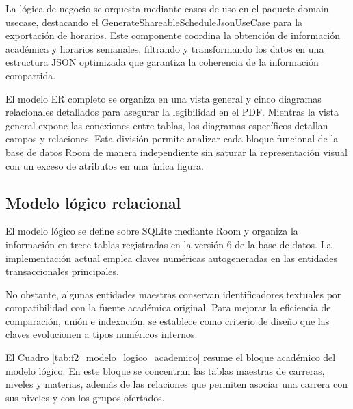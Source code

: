 La lógica de negocio se orquesta mediante casos de uso en el paquete domain usecase, destacando el GenerateShareableScheduleJsonUseCase para la exportación de horarios. Este componente coordina la obtención de información académica y horarios semanales, filtrando y transformando los datos en una estructura JSON optimizada que garantiza la coherencia de la información compartida.

El modelo ER completo se organiza en una vista general y cinco diagramas relacionales detallados para asegurar la legibilidad en el PDF. Mientras la vista general expone las conexiones entre tablas, los diagramas específicos detallan campos y relaciones. Esta división permite analizar cada bloque funcional de la base de datos Room de manera independiente sin saturar la representación visual con un exceso de atributos en una única figura.

\subsection{Modelo lógico relacional}
El modelo lógico se define sobre SQLite mediante Room y organiza la información en trece tablas registradas en la versión 6 de la base de datos. La implementación actual emplea claves numéricas autogeneradas en las entidades transaccionales principales.

No obstante, algunas entidades maestras conservan identificadores textuales por compatibilidad con la fuente académica original. Para mejorar la eficiencia de comparación, unión e indexación, se establece como criterio de diseño que las claves evolucionen a tipos numéricos internos.

El Cuadro \ref{tab:f2_modelo_logico_academico} resume el bloque académico del modelo lógico. En este bloque se concentran las tablas maestras de carreras, niveles y materias, además de las relaciones que permiten asociar una carrera con sus niveles y con los grupos ofertados.

